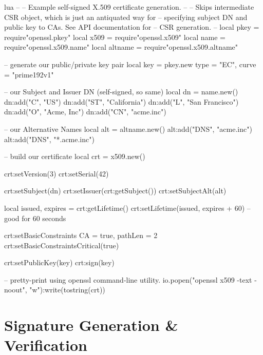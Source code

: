 \documentclass[11pt, oneside]{memoir}
\begin{document}
\begin{example}{lua}
--
-- Example self-signed X.509 certificate generation.
--
-- Skips intermediate CSR object, which is just an antiquated way for
-- specifying subject DN and public key to CAs. See API documentation for
-- CSR generation.
--
local pkey = require"openssl.pkey"
local x509 = require"openssl.x509"
local name = require"openssl.x509.name"
local altname = require"openssl.x509.altname"

-- generate our public/private key pair
local key = pkey.new{ type = "EC", curve = "prime192v1" }

-- our Subject and Issuer DN (self-signed, so same)
local dn = name.new()
dn:add("C", "US")
dn:add("ST", "California")
dn:add("L", "San Francisco")
dn:add("O", "Acme, Inc")
dn:add("CN", "acme.inc")

-- our Alternative Names
local alt = altname.new()
alt:add("DNS", "acme.inc")
alt:add("DNS", "*.acme.inc")

-- build our certificate
local crt = x509.new()

crt:setVersion(3)
crt:setSerial(42)

crt:setSubject(dn)
crt:setIssuer(crt:getSubject())
crt:setSubjectAlt(alt)

local issued, expires = crt:getLifetime()
crt:setLifetime(issued, expires + 60) -- good for 60 seconds

crt:setBasicConstraints{ CA = true, pathLen = 2 }
crt:setBasicConstraintsCritical(true)

crt:setPublicKey(key)
crt:sign(key)

-- pretty-print using openssl command-line utility.
io.popen("openssl x509 -text -noout", "w"):write(tostring(crt))


\end{example}


\clearpage

\section{Signature Generation \& Verification}
\end{document}
